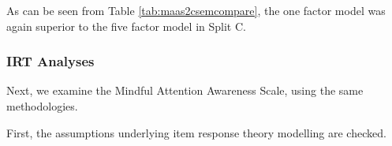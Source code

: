 \documentclass{article}
\begin{document}
\begin{table}[ht]
\centering
{}
\caption{Comparison of Factor Structures for MAAS 2C Solutions, Tested on Split B} 
\label{tab:maas2csemcompare}
\end{table}
As can be seen from Table \ref{tab:maas2csemcompare}, the one factor model was again superior to the five factor model in Split C. 

\subsubsection{IRT Analyses}
\label{sec:irt-analyses}

Next, we examine the Mindful Attention Awareness Scale, using the same methodologies. 

First, the assumptions underlying item response theory modelling are checked. 
\end{document}
